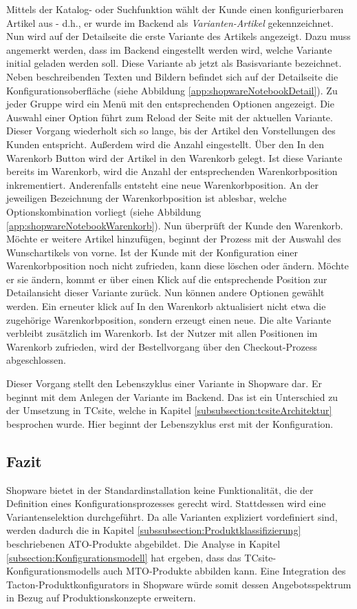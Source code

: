 \documentclass[12pt,a4paper,bibliography=totocnumbered,listof=totoc]{scrartcl}
\begin{document}
Mittels der Katalog- oder Suchfunktion wählt der Kunde einen konfigurierbaren Artikel aus - d.h., er wurde im Backend als \emph{Varianten-Artikel} gekennzeichnet. Nun wird auf der Detailseite die erste Variante des Artikels angezeigt. Dazu muss angemerkt werden, dass im Backend eingestellt werden wird, welche Variante initial geladen werden soll. Diese Variante ab jetzt als Basisvariante bezeichnet. Neben beschreibenden Texten und Bildern befindet sich auf der Detailseite die Konfigurationsoberfläche (siehe Abbildung \ref{app:shopwareNotebookDetail}). Zu jeder Gruppe wird ein Menü mit den entsprechenden Optionen angezeigt. Die Auswahl einer Option führt zum Reload der Seite mit der aktuellen Variante. Dieser Vorgang wiederholt sich so lange, bis der Artikel den Vorstellungen des Kunden entspricht. Außerdem wird die Anzahl eingestellt. Über den \glqq In den Warenkorb\grqq{} Button wird der Artikel in den Warenkorb gelegt. Ist diese Variante bereits im Warenkorb, wird die Anzahl der entsprechenden Warenkorbposition inkrementiert. Anderenfalls entsteht eine neue Warenkorbposition. An der jeweiligen Bezeichnung der Warenkorbposition ist ablesbar, welche Optionskombination vorliegt (siehe Abbildung \ref{app:shopwareNotebookWarenkorb}). Nun überprüft der Kunde den Warenkorb. Möchte er weitere Artikel hinzufügen, beginnt der Prozess mit der Auswahl des Wunschartikels von vorne. Ist der Kunde mit der Konfiguration einer Warenkorbposition noch nicht zufrieden, kann diese löschen oder ändern. Möchte er sie ändern, kommt er über einen Klick auf die entsprechende Position zur Detailansicht dieser Variante zurück. Nun können andere Optionen gewählt werden. Ein erneuter klick auf \glqq In den Warenkorb\grqq{} aktualisiert nicht etwa die zugehörige Warenkorbposition, sondern erzeugt einen neue. Die alte Variante verbleibt zusätzlich im Warenkorb. Ist der Nutzer mit allen Positionen im Warenkorb zufrieden, wird der Bestellvorgang über den Checkout-Prozess abgeschlossen.

Dieser Vorgang stellt den Lebenszyklus einer Variante in Shopware dar. Er beginnt mit dem Anlegen der Variante im Backend. Das ist ein Unterschied zu der Umsetzung in TCsite, welche in Kapitel \ref{subsubsection:tcsiteArchitektur}
 besprochen wurde. Hier beginnt der Lebenszyklus erst mit der Konfiguration.

\subsection{Fazit}
Shopware bietet in der Standardinstallation keine Funktionalität, die der Definition eines Konfigurationsprozesses gerecht wird. Stattdessen wird eine Variantenselektion durchgeführt. Da alle Varianten expliziert vordefiniert sind, werden dadurch die in Kapitel \ref{subssubsection:Produktklassifizierung} beschriebenen \ac{ATO}-Produkte abgebildet. Die Analyse in Kapitel \ref{subsection:Konfigurationsmodell} hat ergeben, dass das TCsite-Konfigurationsmodells auch \ac{MTO}-Produkte abbilden kann. Eine Integration des Tacton-Produktkonfigurators in Shopware würde somit dessen Angebotsspektrum in Bezug auf Produktionskonzepte erweitern.
 
\end{document}
